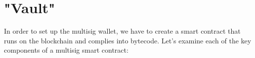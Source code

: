 
\chapter{"Vault" }
\label{ch5sec1}

In order to set up the multisig wallet, we have to create a smart contract that runs on the blockchain and complies into bytecode.  Let's examine each of the key components of a multisig smart contract: